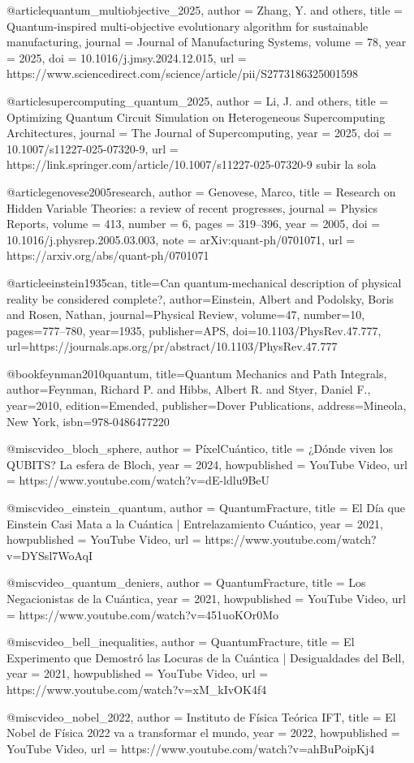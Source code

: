 @article{quantum_multiobjective_2025,
  author = {Zhang, Y. and others},
  title = {Quantum-inspired multi-objective evolutionary algorithm for sustainable manufacturing},
  journal = {Journal of Manufacturing Systems},
  volume = {78},
  year = {2025},
  doi = {10.1016/j.jmsy.2024.12.015},
  url = {https://www.sciencedirect.com/science/article/pii/S2773186325001598}
}

@article{supercomputing_quantum_2025,
  author = {Li, J. and others},
  title = {Optimizing Quantum Circuit Simulation on Heterogeneous Supercomputing Architectures},
  journal = {The Journal of Supercomputing},
  year = {2025},
  doi = {10.1007/s11227-025-07320-9},
  url = {https://link.springer.com/article/10.1007/s11227-025-07320-9}
}subir la sola 

@article{genovese2005research,
  author = {Genovese, Marco},
  title = {Research on Hidden Variable Theories: a review of recent progresses},
  journal = {Physics Reports},
  volume = {413},
  number = {6},
  pages = {319--396},
  year = {2005},
  doi = {10.1016/j.physrep.2005.03.003},
  note = {arXiv:quant-ph/0701071},
  url = {https://arxiv.org/abs/quant-ph/0701071}
}

@article{einstein1935can,
  title={Can quantum-mechanical description of physical reality be considered complete?},
  author={Einstein, Albert and Podolsky, Boris and Rosen, Nathan},
  journal={Physical Review},
  volume={47},
  number={10},
  pages={777--780},
  year={1935},
  publisher={APS},
  doi={10.1103/PhysRev.47.777},
  url={https://journals.aps.org/pr/abstract/10.1103/PhysRev.47.777}
}

@book{feynman2010quantum,
  title={Quantum Mechanics and Path Integrals},
  author={Feynman, Richard P. and Hibbs, Albert R. and Styer, Daniel F.},
  year={2010},
  edition={Emended},
  publisher={Dover Publications},
  address={Mineola, New York},
  isbn={978-0486477220}
}

@misc{video_bloch_sphere,
  author = {{PíxelCuántico}},
  title = {¿Dónde viven los QUBITS? La esfera de Bloch},
  year = {2024},
  howpublished = {YouTube Video},
  url = {https://www.youtube.com/watch?v=dE-ldlu9BeU}
}

@misc{video_einstein_quantum,
  author = {{QuantumFracture}},
  title = {El Día que Einstein Casi Mata a la Cuántica | Entrelazamiento Cuántico},
  year = {2021},
  howpublished = {YouTube Video},
  url = {https://www.youtube.com/watch?v=DYSsl7WoAqI}
}

@misc{video_quantum_deniers,
  author = {{QuantumFracture}},
  title = {Los Negacionistas de la Cuántica},
  year = {2021},
  howpublished = {YouTube Video},
  url = {https://www.youtube.com/watch?v=451uoKOr0Mo}
}

@misc{video_bell_inequalities,
  author = {{QuantumFracture}},
  title = {El Experimento que Demostró las Locuras de la Cuántica | Desigualdades del Bell},
  year = {2021},
  howpublished = {YouTube Video},
  url = {https://www.youtube.com/watch?v=xM_kIvOK4f4}
}

@misc{video_nobel_2022,
  author = {{Instituto de Física Teórica IFT}},
  title = {El Nobel de Física 2022 va a transformar el mundo},
  year = {2022},
  howpublished = {YouTube Video},
  url = {https://www.youtube.com/watch?v=ahBuPoipKj4}
}